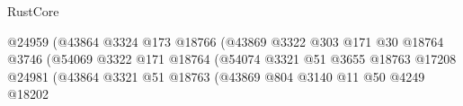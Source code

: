 \begin{lexlean}{RustCore}
\begin{coremodule}
                                                                @24959
                                                                (@43864
                                                                  @3324
                                                                  @173
                                                                  @18766
                                                                  (@43869
                                                                    @3322
                                                                    @303
                                                                    @171
                                                                    @30
                                                                    @18764
                                                                    @3746
                                                                    (@54069
                                                                      @3322
                                                                      @171
                                                                      @18764
                                                                      (@54074
                                                                        @3321
                                                                        @51
                                                                        @3655
                                                                        @18763
                                                                        @17208
                                                                        @24981
                                                                        (@43864
                                                                          @3321
                                                                          @51
                                                                          @18763
                                                                          (@43869
                                                                            @804
                                                                            @3140
                                                                            @11
                                                                            @50
                                                                            @4249
                                                                            @18202

\end{coremodule}
\end{lexlean}
